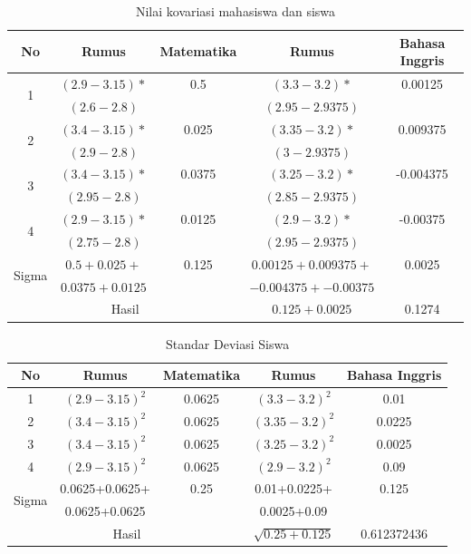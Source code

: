 \begin{enumerate}
    \begin{table}[H]
        \centering
        \begin{tabular}{|c|c|c|c|c|}
            \hline
            No & Rumus & Matematika & Rumus & Bahasa Inggris \\
            \hline
            \multirow{2}{*}{1} & $(2.9-3.15)*$ & 0.5    & $(3.3-3.2)*$ & 0.00125\\
            & $(2.6-2.8)$ & & $(2.95-2.9375)$ &  \\
            \hline
            \multirow{2}{*}{2} & $(3.4-3.15)*$ & 0.025  & $(3.35-3.2)*$ & 0.009375 \\
            & $(2.9-2.8)$ & & $(3-2.9375)$ &  \\
            \hline
            \multirow{2}{*}{3} & $(3.4-3.15)*$ & 0.0375 & $(3.25-3.2)*$ & -0.004375 \\
            & $(2.95-2.8)$ &  & $(2.85-2.9375)$ &  \\
            \hline
            \multirow{2}{*}{4} & $(2.9-3.15)*$ & 0.0125 & $(2.9-3.2)*$ & -0.00375 \\
            & $(2.75-2.8)$ &  & $(2.95-2.9375)$ &  \\
            \hline
            \multirow{2}{*}{Sigma} & $0.5 + 0.025 +$ & 0.125 & $0.00125 + 0.009375 +$ & 0.0025 \\
            & $0.0375 + 0.0125$ & & $-0.004375 + -0.00375$ &  \\
            \hline
            \multicolumn{3}{|c|}{Hasil} & $0.125+0.0025$ & 0.1274 \\
            \hline
        \end{tabular}
        \caption{Nilai kovariasi mahasiswa dan siswa}
        \label{tab:kovariasi}
    \end{table}
    
    \begin{table}[H]
        \centering
        \begin{tabular}{|c|c|c|c|c|}
    		\hline
    		No & Rumus & Matematika & Rumus & Bahasa Inggris\\
    		\hline
    		1 & $(2.9-3.15)^2$ & 0.0625 & $(3.3-3.2)^2$ & 0.01 \\
    		\hline
    		2 & $(3.4-3.15)^2$ & 0.0625 & $(3.35-3.2)^2$ & 0.0225 \\
    		\hline
    		3 & $(3.4-3.15)^2$ & 0.0625 & $(3.25-3.2)^2$ & 0.0025 \\
    		\hline
    		4 & $(2.9-3.15)^2$ & 0.0625 & $(2.9-3.2)^2$ & 0.09 \\
    		\hline
    		\multirow{2}{*}{Sigma} & 0.0625+0.0625+ & 0.25 & 0.01+0.0225+ & 0.125\\
    		& 0.0625+0.0625 & & 0.0025+0.09 & \\
    		\hline
    		\multicolumn{3}{|c|}{Hasil} & $\sqrt{0.25+0.125}$ & 0.612372436 \\
    		\hline
        \end{tabular}
        \caption{Standar Deviasi Siswa}
    	\label{tab:sd_siswa}
    \end{table}
    

\end{enumerate}
